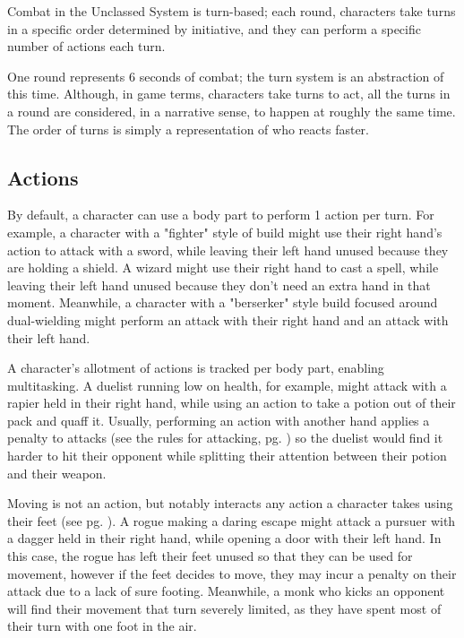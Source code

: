 \begin{multicols*}{2}
    Combat in the Unclassed System is turn-based; each round, characters take
    turns in a specific order determined by initiative, and they can perform
    a specific number of actions each turn.

    One round represents 6 seconds of combat; the turn system is an
    abstraction of this time. Although, in game terms, characters take turns to
    act, all the turns in a round are considered, in a narrative sense, to
    happen at roughly the same time. The order of turns is simply a
    representation of who reacts faster.

    \subsection{Actions}
    By default, a character can use a body part to perform 1 action per turn.
    For example, a character with a "fighter" style of build might use their
    right hand's action to attack with a sword, while leaving their left hand
    unused because they are holding a shield. A wizard might use their right
    hand to cast a spell, while leaving their left hand unused because they
    don't need an extra hand in that moment. Meanwhile, a character with a
    "berserker" style build focused around dual-wielding might perform an
    attack with their right hand and an attack with their left hand.

    A character's allotment of actions is tracked per body part, enabling
    multitasking. A duelist running low on health, for example, might attack
    with a rapier held in their right hand, while using an
    action to take a potion out of their pack and quaff it. Usually,
    performing an action with another hand applies a penalty to attacks (see
    the rules for attacking, pg. \pageref{combat:attacking}) so the duelist
    would find it harder to hit their opponent while splitting their attention
    between their potion and their weapon.

    Moving is not an action, but notably interacts any action a character takes
    using their feet (see pg. \pageref{combat:movement}). A rogue making a
    daring escape might attack a pursuer with a dagger held in their right
    hand, while opening a door with their left hand. In this case, the rogue
    has left their feet unused so that they can be used for movement, however
    if the feet decides to move, they may incur a penalty on their attack due
    to a lack of sure footing. Meanwhile, a monk who kicks an opponent will
    find their movement that turn severely limited, as they have spent most of
    their turn with one foot in the air.


\end{multicols*}
